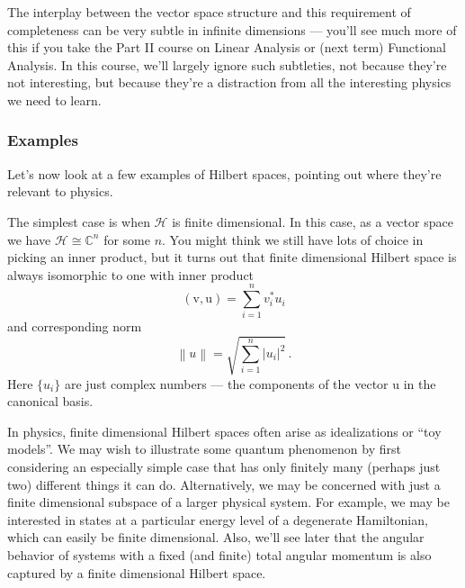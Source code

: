 \documentclass{article}
\theoremstyle{plain}\theoremheaderfont{\normalfont\itshape}\theorembodyfont{\rmfamily}\theoremseparator{.}\newtheorem*{rem}{Remark}\newtheorem*{ex}{Example}\newtheorem*{proof}{Proof}\newtheorem*{altp}{Alternative proof}
\theoremstyle{plain}\theoremheaderfont{\normalfont\bfseries}\theorembodyfont{\rmfamily}\theoremseparator{.}\newtheorem{thm}{Theorem}[section]\newtheorem{lem}[thm]{Lemma}\newtheorem{prop}[thm]{Proposition}\newtheorem*{cor}{Corollary}\newtheorem{defn}[thm]{Definition}\newtheorem{clm}[thm]{Claim}\newtheorem{clminproof}{Claim}
\theoremstyle{break}\theoremheaderfont{\normalfont\itshape}\theorembodyfont{\rmfamily}\theoremseparator{.\medskip}\newtheorem*{proofskip}{Proof}\newtheorem*{exs}{Examples}\newtheorem*{rems}{Remarks}
\theoremstyle{break}\theoremheaderfont{\normalfont\bfseries}\theorembodyfont{\rmfamily}\theoremseparator{.\medskip}\newtheorem{lemskip}[thm]{Lemma}\newtheorem{defnskip}[thm]{Definition}\newtheorem{propskip}[thm]{Proposition}\newtheorem{thmskip}[thm]{Theorem}
\numberwithin{equation}{section}
\newcommand{\vb}[1]{\bm{\mathrm{#1}}}
\newcommand{\abs}[1]{\left| #1 \right|}
\newcommand{\norm}[1]{\left\| #1 \right\|}
\newcommand{\hb}{\mathcal{H}}
\newcommand{\CC}{\mathbb{C}}
\begin{document}
    The interplay between the vector space structure and this requirement of completeness can be very subtle in infinite dimensions --- you'll see much more of this if you take the Part II course on Linear Analysis or (next term) Functional Analysis. In this course, we'll largely ignore such subtleties, not because they're not interesting, but because they're a distraction from all the interesting physics we need to learn.

    \subsubsection{Examples}
    Let's now look at a few examples of Hilbert spaces, pointing out where they're relevant to physics.

    The simplest case is when \(\hb\) is finite dimensional. In this case, as a vector space we have \(\hb\cong\CC^n\) for some \(n\). You might think we still have lots of choice in picking an inner product, but it turns out that finite dimensional Hilbert space is always isomorphic to one with inner product
    \begin{equation}
        (\vb{v},\vb{u})=\sum_{i=1}^{n}v_i^*u_i
    \end{equation}
    and corresponding norm
    \begin{equation}
        \norm{u}=\sqrt{\sum_{i=1}^{n}\abs{u_i}^2}\,.
    \end{equation}
    Here \(\{u_i\}\) are just complex numbers --- the components of the vector \(\vb{u}\) in the canonical basis.

    In physics, finite dimensional Hilbert spaces often arise as idealizations or ``toy models''. We may wish to illustrate some quantum phenomenon by first considering an especially simple case that has only finitely many (perhaps just two) different things it can do. Alternatively, we may be concerned with just a finite dimensional subspace of a larger physical system. For example, we may be interested in states at a particular energy level of a degenerate Hamiltonian, which can easily be finite dimensional. Also, we'll see later that the angular behavior of systems with a fixed (and finite) total angular momentum is also captured by a finite dimensional Hilbert space.
\end{document}
